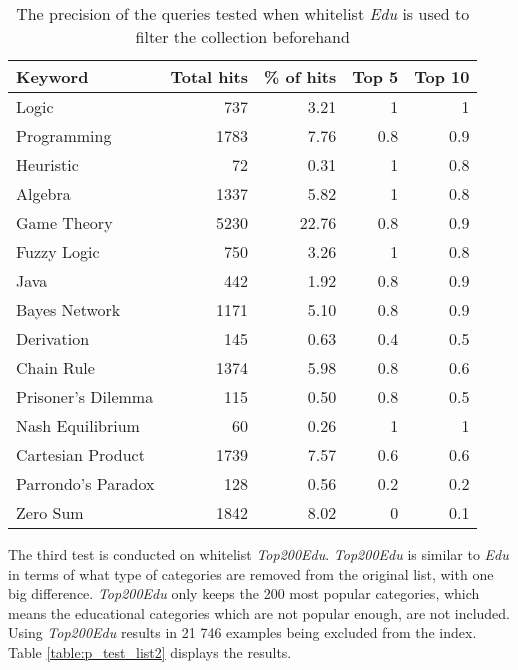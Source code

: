 \begin{table}[h]
\centering
\small
\begin{tabular} {|| p{10em} | r | r | r | r ||} 
 \hline
 Keyword & Total hits & \% of hits & Top 5 & Top 10 \\ [0.5ex] 
 \hline

Logic & 737 & 3.21 & 1 & 1 \\
Programming & 1783 & 7.76 & 0.8 & 0.9 \\
Heuristic & 72 & 0.31 & 1 & 0.8 \\
Algebra & 1337 & 5.82 & 1 & 0.8 \\
Game Theory & 5230 & 22.76 & 0.8 & 0.9 \\
\hline
Fuzzy Logic & 750 & 3.26 & 1 & 0.8 \\
Java & 442 & 1.92 & 0.8 & 0.9 \\
Bayes Network & 1171 & 5.10 & 0.8 & 0.9 \\
Derivation & 145 & 0.63 & 0.4 & 0.5 \\
\hline
Chain Rule & 1374 & 5.98 & 0.8 & 0.6 \\
Prisoner's Dilemma & 115 & 0.50 & 0.8 & 0.5 \\
Nash Equilibrium & 60 & 0.26 & 1 & 1 \\
Cartesian Product & 1739 & 7.57 & 0.6 & 0.6 \\
Parrondo's Paradox & 128 & 0.56 & 0.2 & 0.2 \\
Zero Sum & 1842 & 8.02 & 0 & 0.1 \\

 \hline
\end{tabular}
\caption{The precision of the queries tested when whitelist \textit{Edu} is used to filter the collection beforehand}
\label{table:p_test_list1}
\end{table}
\clearpage


The third test is conducted on whitelist \textit{Top200Edu}. \textit{Top200Edu} is similar to \textit{Edu} in terms of what type of categories are removed from the original list, with one big difference. \textit{Top200Edu} only keeps the 200 most popular categories, which means the educational categories which are not popular enough, are not included. Using \textit{Top200Edu} results in 21 746 examples being excluded from the index. Table \ref{table:p_test_list2} displays the results.


